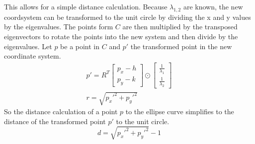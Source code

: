 This allows for a simple distance calculation. Because $\lambda_{1,2}$ are known, the new coordsystem can be transformed to the unit circle by dividing the x and y values by the eigenvalues. The points form $C$ are then multiplied by the transposed eigenvectors to rotate the points into the new system and then divide by the eigenvalues. Let $p$ be a point in $C$ and $p'$ the transformed point in the new coordinate system. 
\begin{align}
    p' = R^T \begin{bmatrix} p_x - h \\ p_y - k \end{bmatrix} \odot \begin{bmatrix} \frac{1}{\lambda_1} \\ \frac{1}{\lambda_2} \end{bmatrix}\\
    r = \sqrt{p_x'^2 + p_y'^2}
    \label{distance calculation}
\end{align}
So the distance calculation of a point $p$ to the ellipse curve simplifies to the distance of the transformed point $p'$ to the unit circle.
\begin{equation}
    d = \sqrt{p_x'^2 + p_y'^2} -1
\end{equation}

